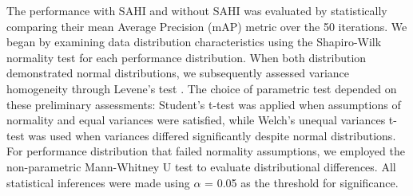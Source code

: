The performance with SAHI and without SAHI was evaluated by statistically comparing their mean Average Precision (mAP) metric over the 50 iterations. We began by examining data distribution characteristics using the Shapiro-Wilk normality test \cite{shapiro_analysis_1965} for each performance distribution. When both distribution demonstrated normal distributions, we subsequently assessed variance homogeneity through Levene's test \cite{levene_robust_1960}.  The choice of parametric test depended on these preliminary assessments: Student's t-test was applied when assumptions of normality and equal variances were satisfied, while Welch's unequal variances t-test \cite{welch_generalization_1947} was used when variances differed significantly despite normal distributions. For performance distribution that failed normality assumptions, we employed the non-parametric Mann-Whitney U test \cite{mann_test_1947} to evaluate distributional differences. All statistical inferences were made using $\alpha$ = 0.05 as the threshold for significance.